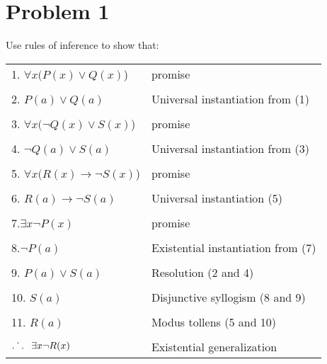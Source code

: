 \documentclass[12pt,letterpaper]{article}
\begin{document}
\section*{Problem 1}
Use rules of inference to show that:\\
\begin{tabular}{  m{5cm}  m{8cm}}\\
1. \({\forall}x(P(x) \lor Q(x)\))  &  promise\\
\\
2. \(P(a) \lor Q(a)\)  &  Universal instantiation from (1)\\
\\
3. \({\forall}x(\neg Q(x) \lor S(x)\))  &  promise \\
\\
4. \(\neg Q(a) \lor S(a)\) &  Universal instantiation from (3) \\
\\
5. \({\forall}x( R(x) \rightarrow \neg S(x)\))  &  promise\\
\\
6. \( R(a) \rightarrow \neg S(a)\)  &  Universal instantiation (5)\\
\\
7.\({\exists}x\neg P(x)\)  &  promise\\
\\
8.\(\neg P(a)\)  &  Existential instantiation from (7)\\
\\
9. \(P(a) \lor S(a)\) &  Resolution (2 and 4) \\
\\
10. \(S(a)\) &  Disjunctive syllogism (8 and 9) \\
\\
11. \(R(a)\) &  Modus tollens (5 and 10) \\
\\
\(\dot{.\hspace{.095in}.}\hspace{.1in}{\exists}x\neg R(x)\)  &  Existential generalization\\
\end{tabular}
\end{document}
